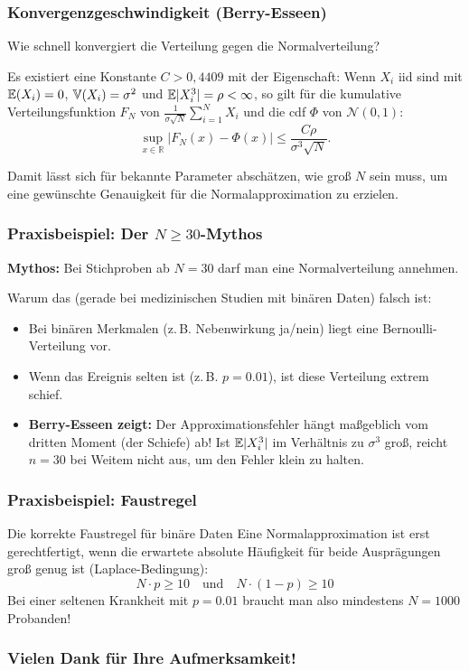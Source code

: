 \begin{frame}
  \frametitle{Konvergenzgeschwindigkeit (Berry-Esseen)}
  Wie schnell konvergiert die Verteilung gegen die Normalverteilung?
  \pause
  \begin{theorem}
    Es existiert eine Konstante $C > 0,4409$ mit der Eigenschaft:
    Wenn $X_i$ iid sind mit $\mathbb{E}(X_i) = 0$, $\mathbb{V}(X_i) = \sigma^2$ und $\mathbb{E}|X_i^3| = \rho < \infty$, so gilt für die kumulative Verteilungsfunktion $F_N$ von $\frac{1}{\sigma\sqrt{N}} \sum_{i=1}^N X_i$ und die cdf $\Phi$ von $\mathcal{N}(0,1)$:
    \[ \sup_{x \in \mathbb{R}} \left| F_N(x) - \Phi(x) \right| \leq \frac{C\rho}{\sigma^3 \sqrt{N}}. \]
  \end{theorem}
  \pause
  \vspace{0.3cm}
  Damit lässt sich für bekannte Parameter abschätzen, wie groß $N$ sein muss, um eine gewünschte Genauigkeit für die Normalapproximation zu erzielen.
\end{frame}

\begin{frame}
  \frametitle{Praxisbeispiel: Der \glqq $N \ge 30$\grqq-Mythos}
  \textbf{Mythos:} \glqq Bei Stichproben ab $N=30$ darf man eine Normalverteilung annehmen.\grqq
  \pause
  
  \vspace{0.3cm}
  Warum das (gerade bei medizinischen Studien mit binären Daten) \alert{falsch} ist:
  \begin{itemize}[<+->]
    \item Bei binären Merkmalen (z.\,B. Nebenwirkung ja/nein) liegt eine Bernoulli-Verteilung vor.
    \item Wenn das Ereignis selten ist (z.\,B. $p=0.01$), ist diese Verteilung extrem schief.
    \item \textbf{Berry-Esseen zeigt:} Der Approximationsfehler hängt maßgeblich vom dritten Moment (der Schiefe) ab! Ist $\mathbb{E}|X_i^3|$ im Verhältnis zu $\sigma^3$ groß, reicht $n=30$ bei Weitem nicht aus, um den Fehler klein zu halten.
  \end{itemize}
\end{frame}

\begin{frame}
  \frametitle{Praxisbeispiel: Faustregel}
  \begin{block}{Die korrekte Faustregel für binäre Daten}
    Eine Normalapproximation ist erst gerechtfertigt, wenn die erwartete absolute Häufigkeit für beide Ausprägungen groß genug ist (\alert{Laplace-Bedingung}):
    \[ N \cdot p \ge 10 \quad \text{und} \quad N \cdot (1-p) \ge 10 \]
    Bei einer seltenen Krankheit mit $p=0.01$ braucht man also mindestens $N=1000$ Probanden!
  \end{block}
\end{frame}

\begin{frame}[separator]
  \frametitle{Vielen Dank für Ihre Aufmerksamkeit!}
\end{frame}



